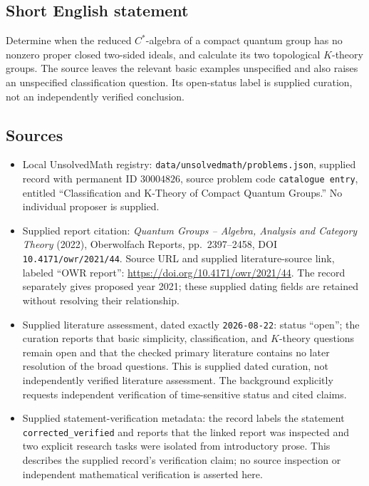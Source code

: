 \documentclass[11pt]{article}
\begin{document}
\subsection{Short English statement}
Determine when the reduced \(C^*\)-algebra of a compact quantum group has no nonzero proper closed two-sided ideals, and calculate its two topological \(K\)-theory groups. The source leaves the relevant basic examples unspecified and also raises an unspecified classification question. Its open-status label is supplied curation, not an independently verified conclusion.
\subsection{Sources}
\begin{itemize}
\item Local UnsolvedMath registry: \texttt{data/unsolvedmath/problems.json}, supplied record with permanent ID \(30004826\), source problem code \texttt{catalogue entry}, entitled ``Classification and K-Theory of Compact Quantum Groups.'' No individual proposer is supplied.
\item Supplied report citation: \emph{Quantum Groups -- Algebra, Analysis and Category Theory} (2022), Oberwolfach Reports, pp.~2397--2458, DOI \texttt{10.4171/owr/2021/44}. Source URL and supplied literature-source link, labeled ``OWR report'': \url{https://doi.org/10.4171/owr/2021/44}. The record separately gives proposed year 2021; these supplied dating fields are retained without resolving their relationship.
\item Supplied literature assessment, dated exactly \texttt{2026-08-22}: status ``open''; the curation reports that basic simplicity, classification, and \(K\)-theory questions remain open and that the checked primary literature contains no later resolution of the broad questions. This is supplied dated curation, not independently verified literature assessment. The background explicitly requests independent verification of time-sensitive status and cited claims.
\item Supplied statement-verification metadata: the record labels the statement \texttt{corrected\_verified} and reports that the linked report was inspected and two explicit research tasks were isolated from introductory prose. This describes the supplied record's verification claim; no source inspection or independent mathematical verification is asserted here.
\end{itemize}
\end{document}
